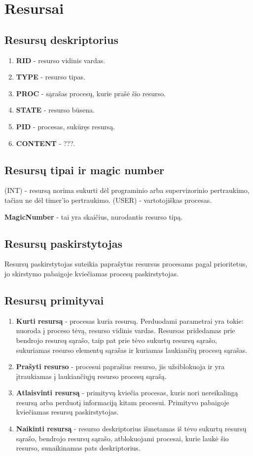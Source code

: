 \section{Resursai}
	\subsection{Resursų deskriptorius}
		\begin{enumerate}
			\item \textbf{RID} - resurso vidinis vardas.
			\item \textbf{TYPE} - resurso tipas.
			\item \textbf{PROC} - sąrašas procesų, kurie prašė šio resurso.
			\item \textbf{STATE} - resurso būsena.
			\item \textbf{PID} - procesas, sukūręs resursą.
			\item \textbf{CONTENT} - ???.
		\end{enumerate}
	\subsection{Resursų tipai ir magic number}
		
		(INT) - resursą norima sukurti dėl programinio arba supervizorinio pertraukimo, tačiau ne dėl timer'io pertraukimo.
		(USER) - vartotojiškas procesas.
		
		\textbf{MagicNumber} - tai yra skaičius, nurodantis resurso tipą.
		
		
	\subsection{Resursų paskirstytojas}
		Resursų paskirstytojas suteikia paprašytus resursus procesams pagal prioritetus, jo skirstymo pabaigoje kviečiamas procesų paskirstytojas. 
	\subsection{Resursų primityvai}
		\begin{enumerate}
			\item \textbf{Kurti resursą} - procesas kuria resursą. Perduodami parametrai yra tokie: nuoroda į proceso tėvą, resurso vidinis vardas. Resursas pridedamas prie bendrojo resursų sąrašo, taip pat prie tėvo sukurtų resursų sąrašo, sukuriamas resurso elementų sąrašas ir kuriamas laukiančių procesų sąrašas.
			\item \textbf{Prašyti resurso} - procesui paprašius resurso, jis užsiblokuoja ir yra įtraukiamas į laukiančiųjų resurso procesų sąrašą.
			\item \textbf{Atlaisvinti resursą} - primityvą kviečia procesas, kuris nori nereikalingą resursą arba perduotį informaciją kitam procesui. Primityvo pabaigoje kviečiamas resursų paskirstytojas.
			\item \textbf{Naikinti resursą} - resurso deskriptorius išmetamas iš tėvo sukurtų resursų sąrašo, bendrojo resursų sąrašo, atblokuojami procesai, kurie laukė šio resurso, sunaikinamas pats deskriptorius.
		\end{enumerate}
		